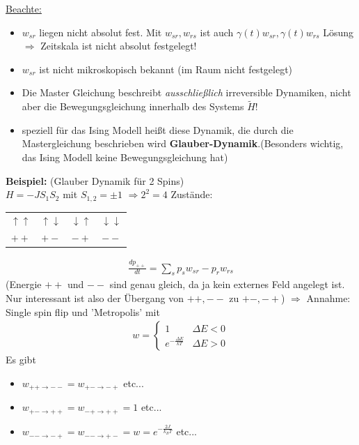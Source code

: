 \documentclass[12pt]{article}
\begin{document}
\underline{Beachte:} 
\begin{itemize}
\item $w_{sr}$ liegen nicht absolut fest. Mit $w_{sr}, w_{rs}$ ist auch $\gamma (t) w_{sr}, \gamma(t) w_{rs}$ Lösung \\  $\Rightarrow$ Zeitskala ist nicht absolut festgelegt!
\item $w_{sr}$ ist nicht mikroskopisch bekannt (im Raum nicht festgelegt)
\item Die Master Gleichung beschreibt \textit{ausschließlich} irreversible Dynamiken, nicht aber die Bewegungsgleichung innerhalb des Systems $\tilde{H}$! %
\item speziell für das Ising Modell heißt diese Dynamik, die durch die Mastergleichung beschrieben wird  \textbf{Glauber-Dynamik}.(Besonders wichtig, das Ising Modell keine Bewegungsgleichung hat)
\end{itemize}


\textbf{Beispiel:} (Glauber Dynamik für 2 Spins) \\ 
$H=-J S_1 S_2$ mit $S_{1,2} = \pm 1$
$\Rightarrow 2^2 =4$ Zustände: 
\begin{center}
\begin{tabular}{c c c c}
$\uparrow \uparrow$ & $\uparrow \downarrow$ & $\downarrow \uparrow$ & $ \downarrow \downarrow$ \\ 
$++$ & $+-$ & $-+$ & $--$ \\ 
\end{tabular} 
\end{center}

 \begin{align*}
 \frac{dp_{++}}{dt} = \sum_s p_s w_{sr} - p_r w_{rs}
 \end{align*}
 (Energie $++$ und $--$ sind genau gleich, da ja kein externes Feld angelegt ist. Nur interessant ist also der Übergang von $++, --$ zu $+-,-+$) $\Rightarrow$ Annahme: Single spin flip und 'Metropolis' mit 
 \begin{align*}
 w=
 \begin{cases}
 1 & \Delta E <0 \\
 e^{- \frac{\Delta E}{kT}} & \Delta E>0
 \end{cases}
 \end{align*}
 Es gibt 
 \begin{itemize}
 \item  $w_{++ \rightarrow --}= w_{+- \rightarrow -+}$ etc...
 \item $w_{+- \rightarrow ++}= w_{-+ \rightarrow ++}=1$ etc...
 \item $w_{-- \rightarrow -+}= w_{-- \rightarrow +-}= w= e^{-\frac{2J}{k_BT}}$ etc... 
 \end{itemize}
 
\end{document}
